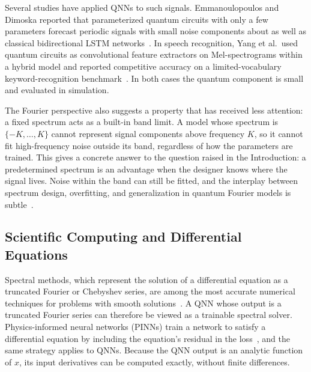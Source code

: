 \documentclass[12pt]{article}
\numberwithin{equation}{section}  %
\begin{document}
Several studies have applied QNNs to such signals. Emmanoulopoulos and Dimoska reported that parameterized quantum circuits with only a few parameters forecast periodic signals with small noise components about as well as classical bidirectional LSTM networks~\cite{emmanoulopoulos2022quantum}. In speech recognition, Yang et al.\ used quantum circuits as convolutional feature extractors on Mel-spectrograms within a hybrid model and reported competitive accuracy on a limited-vocabulary keyword-recognition benchmark~\cite{yang2021decentralizing}. In both cases the quantum component is small and evaluated in simulation.

The Fourier perspective also suggests a property that has received less attention: a fixed spectrum acts as a built-in band limit. A model whose spectrum is $\{-K, \ldots, K\}$ cannot represent signal components above frequency $K$, so it cannot fit high-frequency noise outside its band, regardless of how the parameters are trained. This gives a concrete answer to the question raised in the Introduction: a predetermined spectrum is an advantage when the designer knows where the signal lives. Noise within the band can still be fitted, and the interplay between spectrum design, overfitting, and generalization in quantum Fourier models is subtle~\cite{peters2023generalization}.

\subsection{Scientific Computing and Differential Equations}
\label{sec:app_scientific}

Spectral methods, which represent the solution of a differential equation as a truncated Fourier or Chebyshev series, are among the most accurate numerical techniques for problems with smooth solutions~\cite{boyd2001chebyshev}. A QNN whose output is a truncated Fourier series can therefore be viewed as a trainable spectral solver. Physics-informed neural networks (PINNs) train a network to satisfy a differential equation by including the equation's residual in the loss~\cite{raissi2019physics}, and the same strategy applies to QNNs. Because the QNN output is an analytic function of $x$, its input derivatives can be computed exactly, without finite differences.
\end{document}
